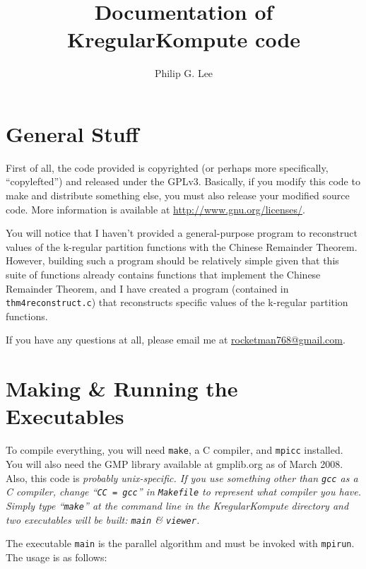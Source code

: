 \documentclass[11pt]{article}
\author{Philip G. Lee}
\title{Documentation of KregularKompute code}
\begin{document}
\maketitle

\section{General Stuff}

First of all, the code provided is copyrighted (or perhaps more specifically, ``copylefted'') and released under
the GPLv3. Basically, if you modify this code to make and distribute something else, you must also release
your modified source code. More information is available at \url{http://www.gnu.org/licenses/}.

You will notice that I haven't provided a general-purpose program to reconstruct values of the k-regular
partition functions with the Chinese Remainder Theorem. However, building such a program should be
relatively simple given that this suite of functions already contains functions that implement the
Chinese Remainder Theorem, and I have created a program (contained in \texttt{thm4reconstruct.c})
that reconstructs specific values of the k-regular partition functions.

If you have any questions at all, please email me at \url{rocketman768@gmail.com}.

\section{Making \& Running the Executables}

To compile everything, you will need \texttt{make}, a C compiler, and \texttt{mpicc} installed. You will also need the GMP library
available at gmplib.org as of March 2008. Also, this code is \itshape probably \upshape unix-specific. If you use something other
than \texttt{gcc} as a C compiler, change ``\texttt{CC = gcc}'' in \texttt{Makefile} to represent what compiler you have.
Simply type ``\texttt{make}'' at the command line in the KregularKompute directory and two executables will be built: \texttt{main} \& \texttt{viewer}.

The executable \texttt{main} is the parallel algorithm and must be invoked with \texttt{mpirun}. The usage is as follows:

\vspace{0cm}
\begin{center}
\end{center}
\vspace{0cm}
\end{document}

